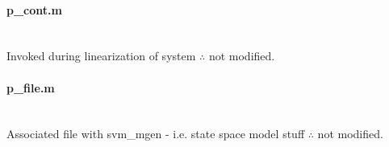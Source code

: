 \documentclass[12pt]{article}
\begin{document}
\paragraph{p\_cont.m} \ \\
Invoked during linearization of system $\therefore$ not modified.

\paragraph{p\_file.m} \ \\
Associated file with svm\_mgen - i.e. state space model stuff $\therefore$ not modified.
\end{document}

